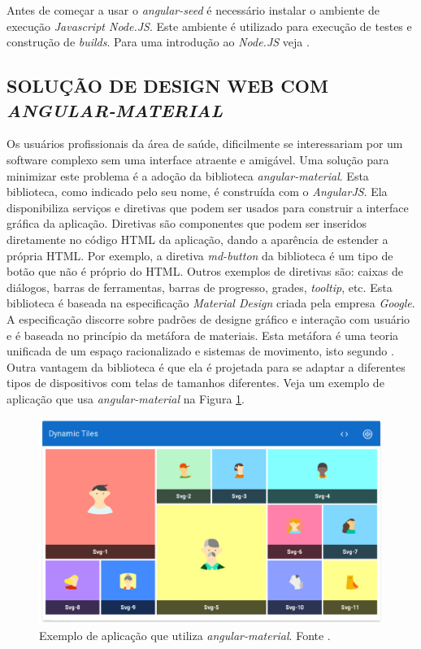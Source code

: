 Antes de começar a usar o \emph{angular-seed} é necessário instalar o ambiente de execução \emph{Javascript Node.JS}. 
Este ambiente é utilizado para execução de testes e construção de \emph{builds}. Para uma introdução ao \emph{Node.JS} veja .
\subsection{SOLUÇÃO DE DESIGN WEB COM \emph{ANGULAR-MATERIAL}}
\label{angular_material}

Os usuários profissionais da área de saúde, dificilmente se interessariam por um software complexo sem uma interface atraente e amigável.
Uma solução para minimizar este problema é a adoção da  biblioteca \emph{angular-material}. 
Esta biblioteca, como indicado pelo seu nome, é construída com o \emph{AngularJS}. 
Ela disponibiliza serviços e diretivas que podem ser usados para construir a interface gráfica da aplicação. 
Diretivas são componentes que podem ser inseridos diretamente no código HTML da aplicação, dando a aparência de estender a própria HTML. 
Por exemplo, a diretiva \emph{md-button} da biblioteca é um tipo de botão que não é próprio do HTML. 
Outros exemplos de diretivas são: caixas de diálogos, barras de ferramentas, barras de progresso, grades, \emph{tooltip}, etc. 
Esta biblioteca é baseada na especificação \emph{Material Design} criada pela empresa \emph{Google}. 
A especificação discorre sobre padrões de designe gráfico e interação com usuário e é baseada no princípio da metáfora de materiais. 
Esta metáfora é uma teoria unificada de um espaço racionalizado e sistemas de movimento, isto segundo . 
Outra vantagem da biblioteca é que ela é projetada para se adaptar a diferentes tipos de dispositivos com telas de tamanhos diferentes.
Veja um exemplo de aplicação que usa \emph{angular-material} na Figura \ref{material_1}.


\begin{figure}[ht]
	\centering
	\includegraphics[width=14cm]{figuras/material.eps}
	\caption{Exemplo de aplicação que utiliza \emph{angular-material}. Fonte \cite{Google2015c}.}
	\label{material_1}
\end{figure}



